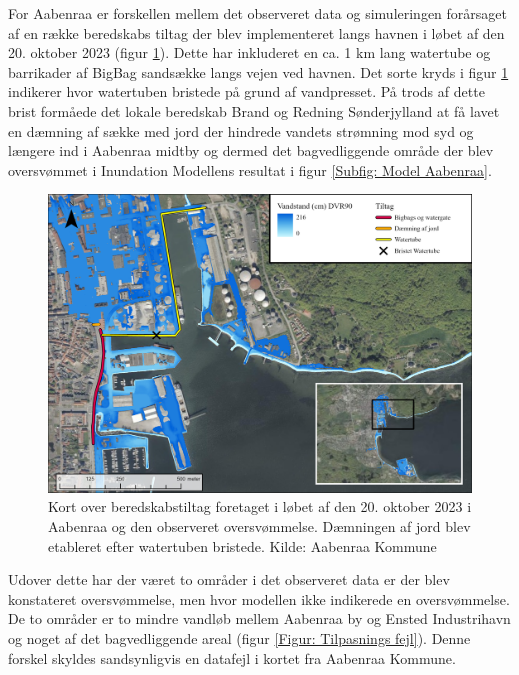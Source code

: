For Aabenraa er forskellen mellem det observeret data og simuleringen forårsaget af en række beredskabs tiltag der blev implementeret langs havnen i løbet af den 20. oktober 2023 (figur \ref{Figur: Beredskabstiltag}). Dette har inkluderet en ca. 1 km lang watertube og barrikader af BigBag sandsække langs vejen ved havnen. Det sorte kryds i figur \ref{Figur: Beredskabstiltag} indikerer hvor watertuben bristede på grund af vandpresset. På trods af dette brist formåede det lokale beredskab Brand og Redning Sønderjylland at få lavet en dæmning af sække med jord der hindrede vandets strømning mod syd og længere ind i Aabenraa midtby og dermed det bagvedliggende område der blev oversvømmet i Inundation Modellens resultat i figur \ref{Subfig: Model Aabenraa}. \\
\begin{figure}[H]
    \centering
    \includegraphics[width=0.8\linewidth]{images/diskussion/beredskabstiltag.jpg}
    \caption{Kort over beredskabstiltag foretaget i løbet af den 20. oktober 2023 i Aabenraa og den observeret oversvømmelse. Dæmningen af jord blev etableret efter watertuben bristede. Kilde: Aabenraa Kommune}
    \label{Figur: Beredskabstiltag}
\end{figure}
Udover dette har der været to områder i det observeret data er der blev konstateret oversvømmelse, men hvor modellen ikke indikerede en oversvømmelse. De to områder er to mindre vandløb mellem Aabenraa by og Ensted Industrihavn og noget af det bagvedliggende areal (figur \ref{Figur: Tilpasnings fejl}). Denne forskel skyldes sandsynligvis en datafejl i kortet fra Aabenraa Kommune. 
